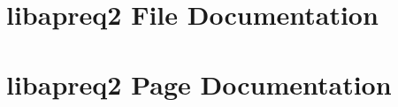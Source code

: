 \documentclass[a4paper]{book}
\begin{document}
\chapter{libapreq2 File Documentation}






\chapter{libapreq2 Page Documentation}




\printindex
\end{document}
